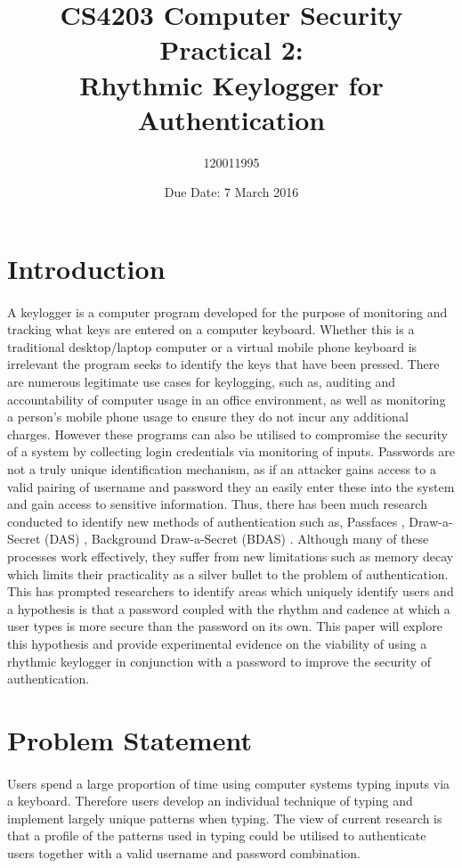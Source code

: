 \documentclass{article}
\title{CS4203 Computer Security Practical 2: \\ Rhythmic Keylogger for Authentication}
\author{120011995}
\date{Due Date: 7 March 2016}
\begin{document}
\maketitle

\section{Introduction}
\paragraph{}
A keylogger is a computer program developed for the purpose of monitoring and tracking what keys are entered on a computer keyboard. Whether this is a traditional desktop/laptop computer or a virtual mobile phone keyboard is irrelevant the program seeks to identify the keys that have been pressed. There are numerous legitimate use cases for keylogging, such as, auditing and accountability of computer usage in an office environment, as well as monitoring a person's mobile phone usage to ensure they do not incur any additional charges. However these programs can also be utilised to compromise the security of a system by collecting login credentials via monitoring of inputs. Passwords are not a truly unique identification mechanism, as if an attacker gains access to a valid pairing of username and password they an easily enter these into the system and gain access to sensitive information. Thus, there has been much research conducted to identify new methods of authentication such as, Passfaces \parencite{Dunphy}, Draw-a-Secret (DAS) \parencite{DunphyYan}, Background
Draw-a-Secret (BDAS) \parencite{DunphyYan}. Although many of these processes work effectively, they suffer from new limitations such as memory decay which limits their practicality as a silver bullet to the problem of authentication. This has prompted researchers to identify areas which uniquely identify users and a hypothesis is that a password coupled with the rhythm and cadence at which a user types is more secure than the password on its own. This paper will explore this hypothesis and provide experimental evidence on the viability of using a rhythmic keylogger in conjunction with a password to improve the security of authentication.         

\section{Problem Statement}
\paragraph{}
Users spend a large proportion of time using computer systems typing inputs via a keyboard. Therefore users develop an individual technique of typing and implement  largely unique patterns when typing. The view of current research is that a profile of the patterns used in typing could be utilised to authenticate users together with a valid username and password combination. 
\end{document}
